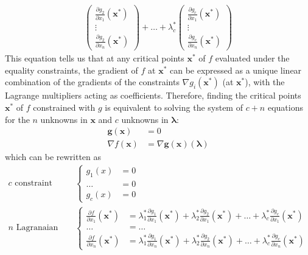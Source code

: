 \begin{theorem}
\begin{align*}
\begin{pmatrix}
  \frac{\partial g_2}{\partial x_1} (\mathbf{x}^*) \\ \vdots \\ \frac{\partial g_2}{\partial x_n}(\mathbf{x}^*)
  \end{pmatrix} + \ldots + \lambda^*_c \begin{pmatrix}
  \frac{\partial g_c}{\partial x_1} (\mathbf{x}^*) \\ \vdots \\ \frac{\partial g_c}{\partial x_n}(\mathbf{x}^*)
  \end{pmatrix}
  \end{align*}
  This equation tells us that at any critical points $\mathbf{x}^*$ of $f$ evaluated under the equality constraints, the gradient of $f$ at $\mathbf{x}^*$ can be expressed as a unique linear combination of the gradients of the constraints $\nabla g_i (\mathbf{x}^*)$ (at $\mathbf{x}^*$), with the Lagrange multipliers acting as coefficients. Therefore, finding the critical points $\mathbf{x}^*$ of $f$ constrained with $g$ is equivalent to solving the system of $c + n$ equations for the $n$ unknowns in $\mathbf{x}$ and $c$ unknowns in $\boldsymbol{\lambda}$: 
  \begin{align*}
      \mathbf{g}(\mathbf{x}) & = 0 \\ 
      \nabla f(\mathbf{x}) & = \nabla \mathbf{g}(\mathbf{x}) (\boldsymbol{\lambda})
  \end{align*} 
  which can be rewritten as
  \begin{align*}
      c \text{ constraint equations} & \begin{cases}
      g_1 (x) & = 0 \\
      \ldots & = 0 \\
      g_c (x) & = 0
      \end{cases} \\
      n \text{ Lagranaian equations} & \begin{cases}
     \frac{\partial f}{\partial x_1} (\mathbf{x}^*) & = \lambda^*_1 \frac{\partial g_1}{\partial x_1} (\mathbf{x}^*) + \lambda^*_2 \frac{\partial g_2}{\partial x_1} (\mathbf{x}^*) + \ldots + \lambda^*_c \frac{\partial g_c}{\partial x_1} (\mathbf{x}^*) \\
      \ldots & = \ldots \\
      \frac{\partial f}{\partial x_n} (\mathbf{x}^*) & = \lambda^*_1 \frac{\partial g_1}{\partial x_n} (\mathbf{x}^*) + \lambda^*_2 \frac{\partial g_2}{\partial x_n} (\mathbf{x}^*) + \ldots + \lambda^*_c \frac{\partial g_c}{\partial x_n} (\mathbf{x}^*) 
      \end{cases}
  \end{align*}
  \end{theorem}

